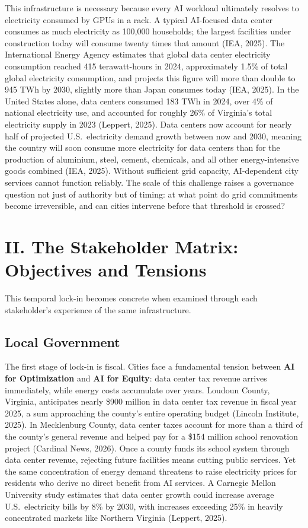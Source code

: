 \documentclass[10pt, twocolumn]{article}
\begin{document}
This infrastructure is necessary because every AI workload ultimately resolves to electricity consumed by GPUs in a rack. A typical AI-focused data center consumes as much electricity as 100,000 households; the largest facilities under construction today will consume twenty times that amount (IEA, 2025). The International Energy Agency estimates that global data center electricity consumption reached 415 terawatt-hours in 2024, approximately 1.5\% of total global electricity consumption, and projects this figure will more than double to 945 TWh by 2030, slightly more than Japan consumes today (IEA, 2025). In the United States alone, data centers consumed 183 TWh in 2024, over 4\% of national electricity use, and accounted for roughly 26\% of Virginia's total electricity supply in 2023 (Leppert, 2025). Data centers now account for nearly half of projected U.S.\ electricity demand growth between now and 2030, meaning the country will soon consume more electricity for data centers than for the production of aluminium, steel, cement, chemicals, and all other energy-intensive goods combined (IEA, 2025). Without sufficient grid capacity, AI-dependent city services cannot function reliably. The scale of this challenge raises a governance question not just of authority but of timing: at what point do grid commitments become irreversible, and can cities intervene before that threshold is crossed?

\section*{II. The Stakeholder Matrix: Objectives and Tensions}

This temporal lock-in becomes concrete when examined through each stakeholder's experience of the same infrastructure.

\subsection*{Local Government}

The first stage of lock-in is fiscal. Cities face a fundamental tension between \textbf{AI for Optimization} and \textbf{AI for Equity}: data center tax revenue arrives immediately, while energy costs accumulate over years. Loudoun County, Virginia, anticipates nearly \$900 million in data center tax revenue in fiscal year 2025, a sum approaching the county's entire operating budget (Lincoln Institute, 2025). In Mecklenburg County, data center taxes account for more than a third of the county's general revenue and helped pay for a \$154 million school renovation project (Cardinal News, 2026). Once a county funds its school system through data center revenue, rejecting future facilities means cutting public services. Yet the same concentration of energy demand threatens to raise electricity prices for residents who derive no direct benefit from AI services. A Carnegie Mellon University study estimates that data center growth could increase average U.S.\ electricity bills by 8\% by 2030, with increases exceeding 25\% in heavily concentrated markets like Northern Virginia (Leppert, 2025).
\end{document}
